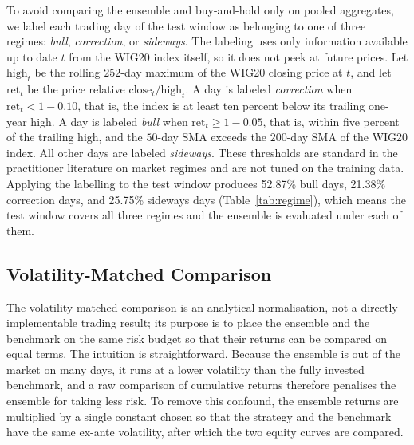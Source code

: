 \documentclass{ieeeaccess}
\newcommand{\RegBullShare}{52.87\%}
\newcommand{\RegCorrectionShare}{21.38\%}
\newcommand{\RegSidewaysShare}{25.75\%}
\begin{document}
To avoid comparing the ensemble and buy-and-hold only on pooled aggregates, we label each trading day of the test window as belonging to one of three regimes: \emph{bull}, \emph{correction}, or \emph{sideways}. The labeling uses only information available up to date $t$ from the WIG20 index itself, so it does not peek at future prices. Let $\mathrm{high}_t$ be the rolling $252$-day maximum of the WIG20 closing price at $t$, and let $\mathrm{ret}_t$ be the price relative $\mathrm{close}_t / \mathrm{high}_t$. A day is labeled \emph{correction} when $\mathrm{ret}_t < 1 - 0.10$, that is, the index is at least ten percent below its trailing one-year high. A day is labeled \emph{bull} when $\mathrm{ret}_t \geq 1 - 0.05$, that is, within five percent of the trailing high, and the $50$-day SMA exceeds the $200$-day SMA of the WIG20 index. All other days are labeled \emph{sideways}. These thresholds are standard in the practitioner literature on market regimes and are not tuned on the training data. Applying the labelling to the test window produces \RegBullShare{} bull days, \RegCorrectionShare{} correction days, and \RegSidewaysShare{} sideways days (Table~\ref{tab:regime}), which means the test window covers all three regimes and the ensemble is evaluated under each of them.

\subsection{Volatility-Matched Comparison}
\label{subsec:volmatch}

The volatility-matched comparison is an analytical normalisation, not a directly implementable trading result; its purpose is to place the ensemble and the benchmark on the same risk budget so that their returns can be compared on equal terms. The intuition is straightforward. Because the ensemble is out of the market on many days, it runs at a lower volatility than the fully invested benchmark, and a raw comparison of cumulative returns therefore penalises the ensemble for taking less risk. To remove this confound, the ensemble returns are multiplied by a single constant chosen so that the strategy and the benchmark have the same ex-ante volatility, after which the two equity curves are compared.
\end{document}
